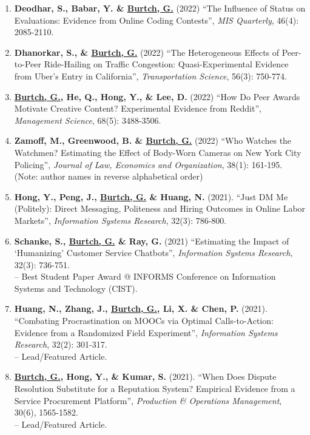 \documentclass[10.5pt,letterpaper,sans]{moderncv}        %
\begin{document}
\begin{enumerate}[leftmargin=!,labelindent=5pt,itemindent=-15pt]
\item \textbf{Deodhar, S., Babar, Y. \& \underline{Burtch, G.}} (2022) ``The Influence of Status on Evaluations: Evidence from Online Coding Contests'', \textit{MIS Quarterly}, 46(4): 2085-2110.

\item \textbf{Dhanorkar, S., \& \underline{Burtch, G.}} (2022) ``The Heterogeneous Effects of Peer-to-Peer Ride-Hailing on Traffic Congestion: Quasi-Experimental Evidence from Uber's Entry in California'', \textit{Transportation Science}, 56(3): 750-774.

\item \textbf{\underline{Burtch, G.}, He, Q., Hong, Y., \& Lee, D.} (2022) ``How Do Peer Awards Motivate Creative Content? Experimental Evidence from Reddit'', \textit{Management Science}, 68(5): 3488-3506.

\item \textbf{Zamoff, M., Greenwood, B. \& \underline{Burtch, G.}} (2022) ``Who Watches the Watchmen? Estimating the Effect of Body-Worn Cameras on New York City Policing'', \textit{Journal of Law, Economics and Organization}, 38(1): 161-195. (Note: author names in reverse alphabetical order)

\item \textbf{Hong, Y., Peng, J., \underline{Burtch, G.} \& Huang, N.} (2021). ``Just DM Me (Politely): Direct Messaging, Politeness and Hiring Outcomes in Online Labor Markets'', \textit{Information Systems Research}, 32(3): 786-800.

\item \textbf{Schanke, S., \underline{Burtch, G.} \& Ray, G.} (2021) ``Estimating the Impact of `Humanizing' Customer Service Chatbots'', \textit{Information Systems Research}, 32(3): 736-751. \\-- Best Student Paper Award @ INFORMS Conference on Information Systems and Technology (CIST).

\item \textbf{Huang, N., Zhang, J., \underline{Burtch, G.}, Li, X. \& Chen, P.} (2021). ``Combating Procrastination on MOOCs via Optimal Calls-to-Action: Evidence from a Randomized Field Experiment'', \textit{Information Systems Research},  32(2): 301-317. \\-- Lead/Featured Article.

\item \textbf{\underline{Burtch, G.}, Hong, Y., \& Kumar, S.} (2021). ``When Does Dispute Resolution Substitute for a Reputation System? Empirical Evidence from a Service Procurement Platform'', \textit{Production \& Operations Management}, 30(6), 1565-1582.\\-- Lead/Featured Article.


\end{enumerate}
\end{document}
